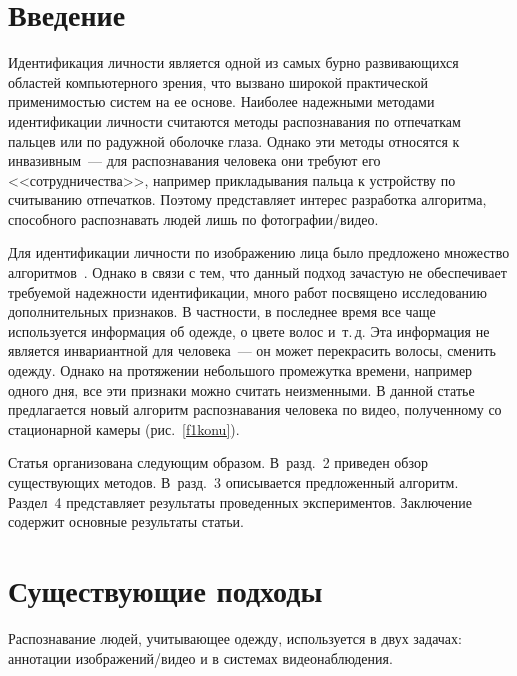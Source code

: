       \begin{multicols}{2}

      \label{st\stat}



\section{Введение}
Идентификация личности является одной из самых бурно развивающихся областей 
компьютерного зрения, что вызвано широкой практической применимостью систем на ее основе. 
Наиболее надежными методами идентификации личности считаются методы распознавания по 
отпечаткам пальцев или по радужной оболочке глаза. Однако эти методы относятся к 
инвазивным~--- для распознавания человека они требуют его <<сотрудничества>>, например 
прикладывания пальца к устройству по считыванию отпечатков. Поэтому представляет интерес 
разработка алгоритма, способного распознавать людей лишь по фотографии/видео. 

Для идентификации личности по изображению лица было предложено множество 
алгоритмов~\cite{9konu}. Однако в связи с тем, что данный подход за\-час\-тую не обеспечивает 
требуемой надежности идентификации, много работ посвящено исследованию дополнительных 
признаков. В частности, в последнее время все чаще используется информация об одежде, о 
цвете волос и~т.\,д. Эта информация не является инвариантной для человека~--- он может 
перекрасить волосы, сменить одежду. Однако на протяжении небольшого промежутка времени, 
например одного дня, все эти признаки можно считать неизменными. В данной статье 
предлагается новый алгоритм распознавания человека по видео, полученному со стационарной 
камеры (рис.~\ref{f1konu}). 


Статья организована следующим образом. В~разд.~2 приведен обзор существующих методов. 
В~разд.~3 описывается предложенный алгоритм. Раздел~4 представляет результаты 
проведенных экспериментов. Заключение содержит основные результаты статьи.

\section{Существующие подходы}

Распознавание людей, учитывающее одежду, используется в двух задачах: аннотации 
изображений/видео и в системах видеонаблюдения. 


\begin{figure*} %
\vspace*{1pt}
\begin{center}
\mbox{%
\epsfxsize=164.818mm
}
\end{center}
\vspace*{-9pt}
\end{figure*}


\end{multicols}
